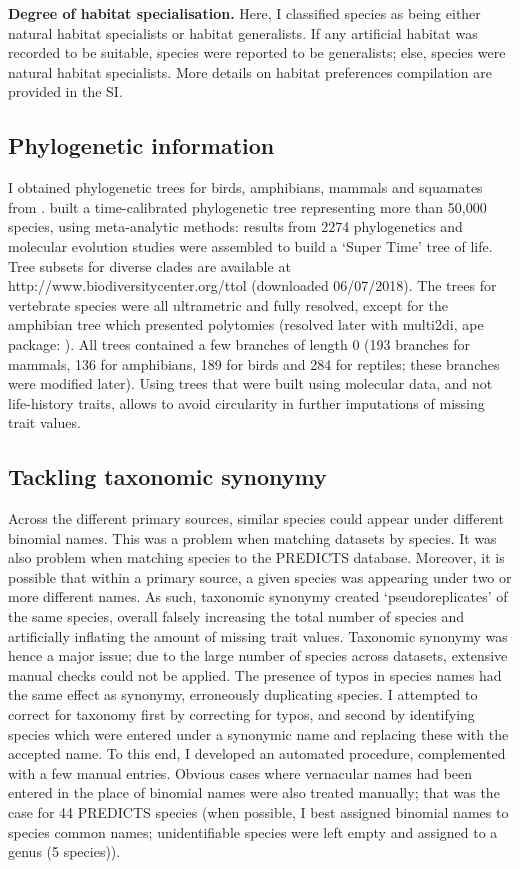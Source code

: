 \textbf{Degree of habitat specialisation.} Here, I classified species as being either natural habitat specialists or habitat generalists. If any artificial habitat was recorded to be suitable, species were reported to be generalists; else, species were natural habitat specialists. More details on habitat preferences compilation are provided in the SI. 

\subsection{Phylogenetic information}
I obtained phylogenetic trees for birds, amphibians, mammals and squamates from \citet{Hedges2015}. \citet{Hedges2015} built a time-calibrated phylogenetic tree representing more than 50,000 species, using meta-analytic methods: results from 2274 phylogenetics and molecular evolution studies were assembled to build a `Super Time' tree of life. Tree subsets for diverse clades are available at http://www.biodiversitycenter.org/ttol (downloaded 06/07/2018). The trees for vertebrate species were all ultrametric and fully resolved, except for the amphibian tree which presented polytomies (resolved later with multi2di, ape package: \citep{ape}). All trees contained a few branches of length 0 (193 branches for mammals, 136 for amphibians, 189 for birds and 284 for reptiles; these branches were modified later). Using trees that were built using molecular data, and not life-history traits, allows to avoid circularity in further imputations of missing trait values.


\subsection{Tackling taxonomic synonymy}
Across the different primary sources, similar species could appear under different binomial names. This was a problem when matching datasets by species. It was also problem when matching species to the PREDICTS database. Moreover, it is possible that within a primary source, a given species was appearing under two or more different names. As such, taxonomic synonymy created `pseudoreplicates' of the same species, overall falsely increasing the total number of species and artificially inflating the amount of missing trait values. Taxonomic synonymy was hence a major issue; due to the large number of species across datasets, extensive manual checks could not be applied. The presence of typos in species names had the same effect as synonymy, erroneously duplicating species. I attempted to correct for taxonomy first by correcting for typos, and second by identifying species which were entered under a synonymic name and replacing these with the accepted name. To this end, I developed an automated procedure, complemented with a few manual entries. Obvious cases where vernacular names had been entered in the place of binomial names were also treated manually; that was the case for 44 PREDICTS species (when possible, I best assigned binomial names to species common names; unidentifiable species were left empty and assigned to a genus (5 species)).

